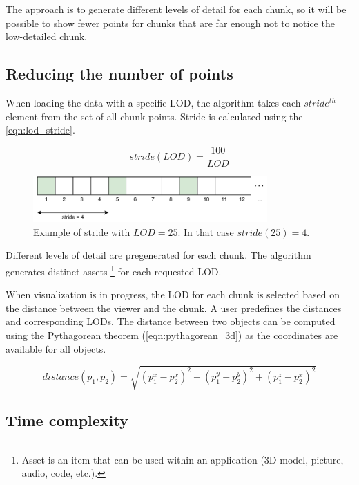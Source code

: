The approach is to generate different levels of detail for each chunk, so it will be possible to show fewer points for chunks that are far enough not to notice the low-detailed chunk.

\subsection{Reducing the number of points}

When loading the data with a specific LOD, the algorithm takes each $stride^{th}$ element from the set of all chunk points. Stride is calculated using the \autoref{eqn:lod_stride}.

\begin{equation}
\label{eqn:lod_stride}
stride(LOD) = \frac{100}{LOD}
\end{equation}

\begin{figure}[htb]
    \centering
    \includegraphics[width=0.8\textwidth]{lod-stride.pdf}
    \caption{Example of stride with $LOD = 25$. In that case $stride(25)=4$.}
    \label{fig:stride}
\end{figure}

Different levels of detail are pregenerated for each chunk. The algorithm generates distinct assets \footnote{Asset is an item that can be used within an application (3D model, picture, audio, code, etc.).} for each requested LOD.

When visualization is in progress, the LOD for each chunk is selected based on the distance between the viewer and the chunk. A user predefines the distances and corresponding LODs. The distance between two objects can be computed using the Pythagorean theorem (\autoref{eqn:pythagorean_3d}) as the coordinates are available for all objects.

\begin{equation}
\label{eqn:pythagorean_3d}
distance(p_1, p_2) = \sqrt{(p_1^x-p_2^x)^2 + (p_1^y-p_2^y)^2 + (p_1^z-p_2^x)^2}
\end{equation}

\subsection{Time complexity}

